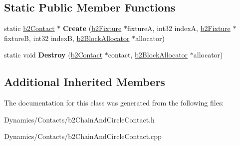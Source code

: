\subsection*{Static Public Member Functions}
\begin{DoxyCompactItemize}
\item 
\mbox{\label{classb2ChainAndCircleContact_a9738f9b3eeddb824213abaae78ff6a73}} 
static \mbox{\hyperlink{classb2Contact}{b2\+Contact}} $\ast$ {\bfseries Create} (\mbox{\hyperlink{classb2Fixture}{b2\+Fixture}} $\ast$fixtureA, int32 indexA, \mbox{\hyperlink{classb2Fixture}{b2\+Fixture}} $\ast$fixtureB, int32 indexB, \mbox{\hyperlink{classb2BlockAllocator}{b2\+Block\+Allocator}} $\ast$allocator)
\item 
\mbox{\label{classb2ChainAndCircleContact_a1070fc727a3c52a160c7919c9650b4e3}} 
static void {\bfseries Destroy} (\mbox{\hyperlink{classb2Contact}{b2\+Contact}} $\ast$contact, \mbox{\hyperlink{classb2BlockAllocator}{b2\+Block\+Allocator}} $\ast$allocator)
\end{DoxyCompactItemize}
\subsection*{Additional Inherited Members}


The documentation for this class was generated from the following files\+:\begin{DoxyCompactItemize}
\item 
Dynamics/\+Contacts/b2\+Chain\+And\+Circle\+Contact.\+h\item 
Dynamics/\+Contacts/b2\+Chain\+And\+Circle\+Contact.\+cpp\end{DoxyCompactItemize}
